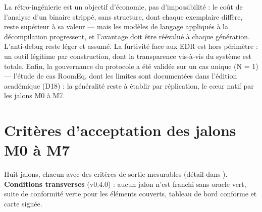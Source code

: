 La rétro-ingénierie est un objectif d'économie, pas d'impossibilité : le coût de l'analyse
d'un binaire strippé, sans structure, dont chaque exemplaire diffère, reste supérieur à sa
valeur — mais les modèles de langage appliqués à la décompilation progressent, et
l'avantage doit être réévalué à chaque génération. L'anti-debug reste léger et assumé.
La furtivité face aux EDR est hors périmètre : un outil légitime par construction, dont
la transparence vis-à-vis du système est totale. Enfin, la gouvernance du protocole a été
validée sur un cas unique (N = 1) — l'étude de cas RoomEq, dont les limites sont
documentées dans l'édition académique (D18) : la généralité reste à établir par
réplication, le cœur natif par les jalons M0 à M7.

\section{Critères d'acceptation des jalons M0 à M7}\label{sec:jalons}

Huit jalons, chacun avec des critères de sortie mesurables (détail dans
). \textbf{Conditions transverses} (v0.4.0) : aucun jalon n'est
franchi sans oracle vert, suite de conformité verte pour les éléments couverts, tableau de
bord conforme et carte signée.

